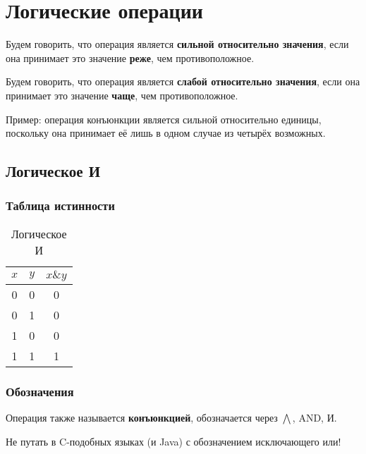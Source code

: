\section{Логические операции}

\begin{definition}
	Будем говорить, что операция является \textbf{сильной относительно значения}, если она принимает это значение \textbf{реже}, чем противоположное.
\end{definition}

\begin{definition}
	Будем говорить, что операция является \textbf{слабой относительно значения}, если она принимает это значение \textbf{чаще}, чем противоположное.
\end{definition}
Пример: операция конъюнкции является сильной относительно единицы, поскольку она принимает её лишь в одном случае из четырёх возможных.

\subsection{Логическое И}
\subsubsection{Таблица истинности}
\begin{table}[h]
	\begin{center}
		\begin{tabular}{|c|c|c|}
			\hline
			$x$ & $y$ & $x\&y$\\
			\hline
			0 & 0 & 0\\
			\hline
			0 & 1 & 0\\
			\hline
			1 & 0 & 0\\
			\hline
			1 & 1 & 1\\
			\hline
		\end{tabular}
		\caption{Логическое И}
	\end{center}
\end{table}

\subsubsection{Обозначения}
Операция также называется \textbf{конъюнкцией}, обозначается через $\bigwedge$, AND, И.
\begin{remark}
	Не путать в C-подобных языках (и Java) с обозначением исключающего или!
\end{remark}

